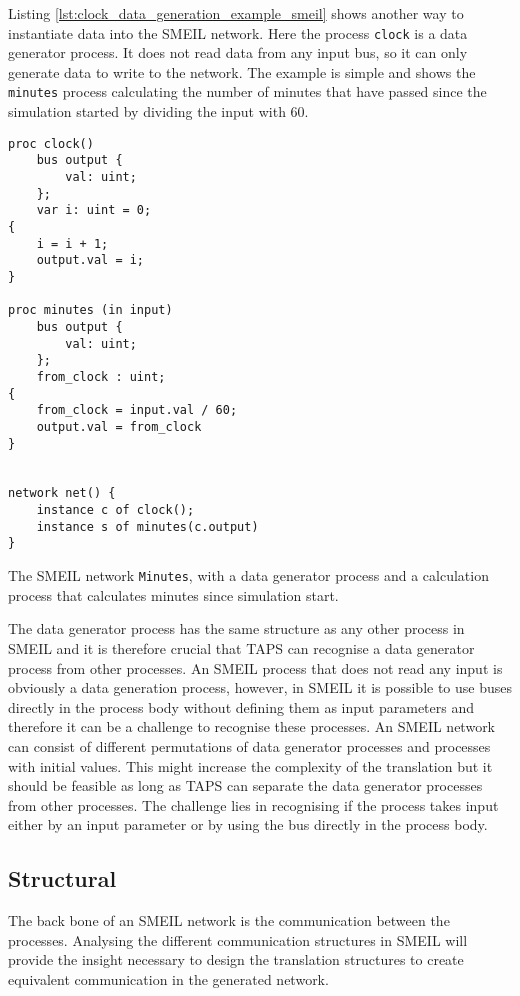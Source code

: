 Listing \ref{lst:clock_data_generation_example_smeil} shows another way to instantiate data into the SMEIL network. Here the process \texttt{clock} is a data generator process. It does not read data from any input bus, so it can only generate data to write to the network. The example is simple and shows the \texttt{minutes} process calculating the number of minutes that have passed since the simulation started by dividing the input with 60.
\begin{listing}
    \begin{verbatim}
proc clock()
    bus output {
        val: uint;
    };
    var i: uint = 0;
{
    i = i + 1;
    output.val = i;
}

proc minutes (in input)
    bus output {
        val: uint;
    };
    from_clock : uint;
{
    from_clock = input.val / 60;
    output.val = from_clock
}


network net() {
    instance c of clock();
    instance s of minutes(c.output)
}
    \end{verbatim}
    \caption{The SMEIL network \texttt{Minutes}, with a data generator process and a calculation process that calculates minutes since simulation start.}
    \label{lst:clock_data_generation_example_smeil}
\end{listing}

The data generator process has the same structure as any other process in SMEIL and it is therefore crucial that TAPS can recognise a data generator process from other processes. An SMEIL process that does not read any input is obviously a data generation process, however, in SMEIL it is possible to use buses directly in the process body without defining them as input parameters and therefore it can be a challenge to recognise these processes. An SMEIL network can consist of different permutations of data generator processes and processes with initial values. This might increase the complexity of the translation but it should be feasible as long as TAPS can separate the data generator processes from other processes. The challenge lies in recognising if the process takes input either by an input parameter or by using the bus directly in the process body.
\subsection{Structural}
\label{sec:analysis_structural}
The back bone of an SMEIL network is the communication between the processes. Analysing the different communication structures in SMEIL will provide the insight necessary to design the translation structures to create equivalent communication in the generated \cspm{} network.
